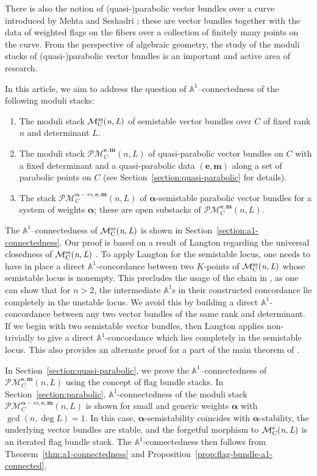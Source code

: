 \documentclass[12pt,reqno]{amsart}
\DeclareMathOperator{\mnlss}{\mc{M}^{ss}_C(\textit{n,\,L})}
\DeclareMathOperator{\mnls}{\mc{M}^{s}_C(\textit{n,\,L})}
\newcommand{\mc}[1]{\mathcal{#1}}
\newcommand{\bb}[1]{\mathbb{#1}}
\theoremstyle{definition}
\numberwithin{equation}{section}
\begin{document}
	There is also the notion of (quasi-)parabolic vector bundles over a curve
	introduced by Mehta and Seshadri \cite{MS80}; these are vector bundles
	together with the data of weighted flags on the fibers over a collection of
	finitely many points on the curve. From the perspective of algebraic
	geometry, the study of the moduli stacks of (quasi-)parabolic vector bundles
	is an important and active area of research.
	
	In this article, we aim to address the question of $\bb{A}^1$--connectedness
	of the following moduli stacks:
	\begin{enumerate}[$\bullet$]
		\item The moduli stack $\mnlss$ of semistable vector bundles over $C$ of
		fixed rank $n$ and determinant $L$.
		\item The moduli stack $\mc{PM}_C^{\boldsymbol{e,m}}(n,L)$ of
		quasi-parabolic vector bundles on $C$ with a fixed determinant and a
		quasi-parabolic data $(\boldsymbol{e,m})$ along a set of parabolic points
		on $C$ (see Section~\ref{section:quasi-parabolic} for details).
		\item The stack $\mc{PM}_C^{\boldsymbol{\alpha}-ss,\boldsymbol{e,m}}(n,L)$
		of $\boldsymbol{\alpha}$-semistable parabolic vector bundles for a system
		of weights $\boldsymbol{\alpha}$; these are open substacks of
		$\mc{PM}_C^{\boldsymbol{e,m}}(n,L)$.
	\end{enumerate}
	The $\bb{A}^1$--connectedness of $\mnlss$ is shown in
	Section~\ref{section:a1-connectedness}. Our proof is based on a result of
	Langton regarding the universal closedness of $\mnlss$ \cite{L75}. To apply
	Langton for the semistable locus, one needs to have in place a direct
	$\bb{A}^1$-concordance between two $K$-points of $\mnlss$ whose semistable
	locus is nonempty. This precludes the usage of the chain in \cite{HY24}, as
	one can show that for $n>2$, the intermediate $\bb{A}^1$s in their
	constructed concordance lie completely in the unstable locus. We avoid this
	by building a direct $\bb{A}^1$-concordance between any two vector bundles
	of the same rank and determinant. If we begin with two semistable vector
	bundles, then Langton applies non-trivially to give a direct
	$\bb{A}^1$-concordance which lies completely in the semistable locus. This
	also provides an alternate proof for a part of the main theorem of
	\cite{HY24}.
	
	In Section~\ref{section:quasi-parabolic}, we prove the
	$\bb{A}^1$--connectedness of $\mc{PM}_C^{\boldsymbol{e,m}}(n,L)$ using the
	concept of flag bundle stacks. In Section~\ref{section:parabolic}, 
	$\bb{A}^1$-connectedness of the moduli stack
	$\mc{PM}_C^{\boldsymbol{\alpha}-ss,\boldsymbol{e,m}}(n,L)$ is shown for small and
	generic weights $\boldsymbol{\alpha}$ with $\gcd(n, \deg L) = 1$. In this
	case, $\boldsymbol{\alpha}$-semistability coincides with
	$\boldsymbol{\alpha}$-stability, the underlying vector bundles are stable,
	and the forgetful morphism to $\mnls$ is an iterated flag bundle stack. The
	$\bb{A}^1$-connectedness then follows from Theorem~\ref{thm:a1-connectedness}
	and Proposition~\ref{prop:flag-bundle-a1-connected}.
	
\end{document}
